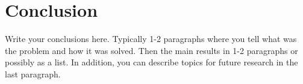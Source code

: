 \chapter{Conclusion}\label{chap:concl}
\beginchapter

Write your conclusions here. Typically 1-2 paragraphs where you tell
what was the problem and how it was solved. Then the main results in
1-2 paragraphs or possibly as a list. In addition, you can describe 
topics for future research in the last paragraph.
